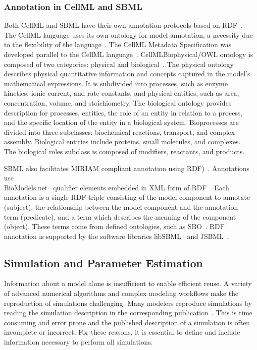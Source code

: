 \documentclass[12pt]{report}
\begin{document}
\subsubsection{Annotation in CellML and SBML}
 Both CellML and SBML have their own annotation protocols based on RDF~\cite{Wimalaratne2009}. The CellML language uses its own ontology for model annotation, a necessity due to the flexibility of the language~\cite{Beard2009}. The CellML Metadata Specification was developed parallel to the CellML language~\cite{Wimalaratne2009}. CellMLBiophysical/OWL ontology is composed of two categories: physical and biological~\cite{Wimalaratne2009}. The physical ontology describes physical quantitative information and concepts captured in the model's mathematical expressions. It is subdivided into processes, such as enzyme kinetics, ionic current, and rate constants, and physical entities, such as area, concentration, volume, and stoichiometry. The biological ontology provides description for processes, entities, the role of an entity in relation to a process, and the specific location of the entity in a biological system. Bioprocesses are divided into three subclasses: biochemical reactions, transport, and complex assembly. Biological entities include proteins, small molecules, and complexes. The biological roles subclass is composed of modifiers, reactants, and products. 

SBML also facilitates MIRIAM compliant annotation using RDF)~\cite{Swainston2009,Decker2000}. Annotations use \\BioModels.net~\cite{LeNovere2006} qualifier elements embedded in XML form of RDF~\cite{Hucka2019}. Each annotation is a single RDF triple consisting of the model component to annotate (subject), the relationship between the model component and the annotation term (predicate), and a term which describes the meaning of the component (object). These terms come from defined ontologies, such as SBO~\cite{SBO}. RDF annotation is supported by the software libraries libSBML~\cite{libSBML} and JSBML~\cite{Rodriguez2015}.



\subsection{Simulation and Parameter Estimation}
Information about a model alone is insufficient to enable efficient reuse. A variety of advanced numerical algorithms and complex modeling workflows make the reproduction of simulations challenging. Many modelers reproduce simulations by reading the simulation description in the corresponding publication~\cite{waltemath_minimum_2011}. This is time consuming and error prone and the published description of a simulation is often incomplete or incorrect. For these reasons, it is essential to define and include information necessary to perform all simulations.
\end{document}
